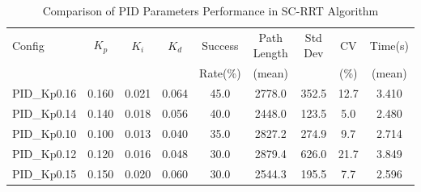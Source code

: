 
\begin{table}[htbp]
\centering
\caption{Comparison of PID Parameters Performance in SC-RRT Algorithm}
\label{tab:pid_comparison}
\begin{tabular}{lcccccccc}
\hline
Config & $K_p$ & $K_i$ & $K_d$ & Success & Path Length & Std Dev & CV & Time(s) \\
 & & & & Rate(\%) & (mean) & & (\%) & (mean) \\
\hline
PID\_Kp0.16 & 0.160 & 0.021 & 0.064 & 45.0 & 2778.0 & 352.5 & 12.7 & 3.410 \\
PID\_Kp0.14 & 0.140 & 0.018 & 0.056 & 40.0 & 2448.0 & 123.5 & 5.0 & 2.480 \\
PID\_Kp0.10 & 0.100 & 0.013 & 0.040 & 35.0 & 2827.2 & 274.9 & 9.7 & 2.714 \\
PID\_Kp0.12 & 0.120 & 0.016 & 0.048 & 30.0 & 2879.4 & 626.0 & 21.7 & 3.849 \\
PID\_Kp0.15 & 0.150 & 0.020 & 0.060 & 30.0 & 2544.3 & 195.5 & 7.7 & 2.596 \\
\hline
\end{tabular}
\end{table}


